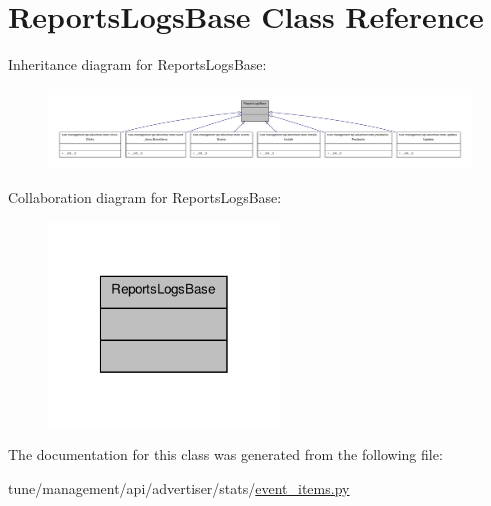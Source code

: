 \hypertarget{classReportsLogsBase}{\section{Reports\-Logs\-Base Class Reference}
\label{classReportsLogsBase}
}


Inheritance diagram for Reports\-Logs\-Base\-:
\nopagebreak
\begin{figure}[H]
\begin{center}
\leavevmode
\includegraphics[width=350pt]{classReportsLogsBase__inherit__graph}
\end{center}
\end{figure}


Collaboration diagram for Reports\-Logs\-Base\-:
\nopagebreak
\begin{figure}[H]
\begin{center}
\leavevmode
\includegraphics[width=174pt]{classReportsLogsBase__coll__graph}
\end{center}
\end{figure}


The documentation for this class was generated from the following file\-:\begin{DoxyCompactItemize}
\item 
tune/management/api/advertiser/stats/\hyperlink{event__items_8py}{event\-\_\-items.\-py}\end{DoxyCompactItemize}
